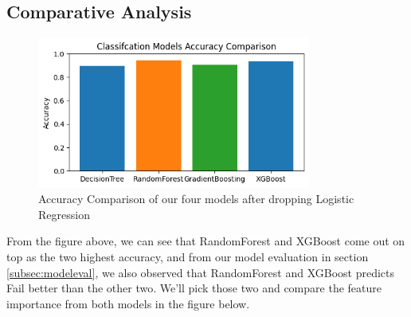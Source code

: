 \documentclass[11pt,a4paper]{article}
\begin{document}
\subsection{Comparative Analysis}
\begin{figure} [H]
\centering %
\includegraphics[width=9cm]{classification_model_comparison.png}
\caption{Accuracy Comparison of our four models after dropping Logistic Regression}
\label{fig:modelacccomparison}
\end{figure}

From the figure above, we can see that RandomForest and XGBoost come out on top as the two highest accuracy, and from our model evaluation in section \ref{subsec:modeleval}, we also observed that RandomForest and XGBoost predicts Fail better than the other two. We'll pick those two and compare the feature importance from both models in the figure below.
\end{document}
